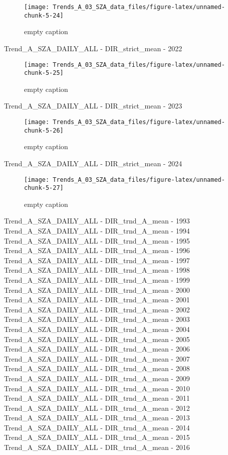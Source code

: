 \documentclass[
  10pt,
  a4paper,oneside]{article}
\begin{document}
\begin{figure}[!ht]

{\centering \texttt{[image: Trends\_A\_03\_SZA\_data\_files/figure-latex/unnamed-chunk-5-24]} 

}

\caption{ empty caption }\label{fig:unnamed-chunk-5-24}
\end{figure}

Trend\_A\_SZA\_DAILY\_ALL - DIR\_strict\_mean - 2022

\begin{figure}[!ht]

{\centering \texttt{[image: Trends\_A\_03\_SZA\_data\_files/figure-latex/unnamed-chunk-5-25]} 

}

\caption{ empty caption }\label{fig:unnamed-chunk-5-25}
\end{figure}

Trend\_A\_SZA\_DAILY\_ALL - DIR\_strict\_mean - 2023

\begin{figure}[!ht]

{\centering \texttt{[image: Trends\_A\_03\_SZA\_data\_files/figure-latex/unnamed-chunk-5-26]} 

}

\caption{ empty caption }\label{fig:unnamed-chunk-5-26}
\end{figure}

Trend\_A\_SZA\_DAILY\_ALL - DIR\_strict\_mean - 2024

\begin{figure}[!ht]

{\centering \texttt{[image: Trends\_A\_03\_SZA\_data\_files/figure-latex/unnamed-chunk-5-27]} 

}

\caption{ empty caption }\label{fig:unnamed-chunk-5-27}
\end{figure}

Trend\_A\_SZA\_DAILY\_ALL - DIR\_trnd\_A\_mean - 1993
Trend\_A\_SZA\_DAILY\_ALL - DIR\_trnd\_A\_mean - 1994
Trend\_A\_SZA\_DAILY\_ALL - DIR\_trnd\_A\_mean - 1995
Trend\_A\_SZA\_DAILY\_ALL - DIR\_trnd\_A\_mean - 1996
Trend\_A\_SZA\_DAILY\_ALL - DIR\_trnd\_A\_mean - 1997
Trend\_A\_SZA\_DAILY\_ALL - DIR\_trnd\_A\_mean - 1998
Trend\_A\_SZA\_DAILY\_ALL - DIR\_trnd\_A\_mean - 1999
Trend\_A\_SZA\_DAILY\_ALL - DIR\_trnd\_A\_mean - 2000
Trend\_A\_SZA\_DAILY\_ALL - DIR\_trnd\_A\_mean - 2001
Trend\_A\_SZA\_DAILY\_ALL - DIR\_trnd\_A\_mean - 2002
Trend\_A\_SZA\_DAILY\_ALL - DIR\_trnd\_A\_mean - 2003
Trend\_A\_SZA\_DAILY\_ALL - DIR\_trnd\_A\_mean - 2004
Trend\_A\_SZA\_DAILY\_ALL - DIR\_trnd\_A\_mean - 2005
Trend\_A\_SZA\_DAILY\_ALL - DIR\_trnd\_A\_mean - 2006
Trend\_A\_SZA\_DAILY\_ALL - DIR\_trnd\_A\_mean - 2007
Trend\_A\_SZA\_DAILY\_ALL - DIR\_trnd\_A\_mean - 2008
Trend\_A\_SZA\_DAILY\_ALL - DIR\_trnd\_A\_mean - 2009
Trend\_A\_SZA\_DAILY\_ALL - DIR\_trnd\_A\_mean - 2010
Trend\_A\_SZA\_DAILY\_ALL - DIR\_trnd\_A\_mean - 2011
Trend\_A\_SZA\_DAILY\_ALL - DIR\_trnd\_A\_mean - 2012
Trend\_A\_SZA\_DAILY\_ALL - DIR\_trnd\_A\_mean - 2013
Trend\_A\_SZA\_DAILY\_ALL - DIR\_trnd\_A\_mean - 2014
Trend\_A\_SZA\_DAILY\_ALL - DIR\_trnd\_A\_mean - 2015
Trend\_A\_SZA\_DAILY\_ALL - DIR\_trnd\_A\_mean - 2016
\end{document}
